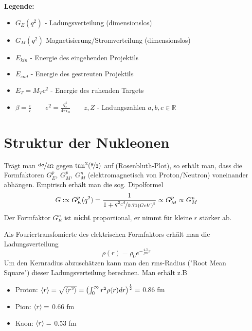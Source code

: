 \documentclass[Ex4_Zusammenfassung.tex]{subfiles}
\begin{document}
\textbf{Legende:} 
\begin{itemize} 
\item $G_E(q^2)$ - Ladungsverteilung (dimensionslos)
\item $G_M(q^2)$ Magnetisierung/Stromverteilung (dimensionslos)
\item $E_{kin}$ - Energie des eingehenden Projektils 
\item $E_ {end}$ - Energie des gestreuten Projektils
\item $E_T = M_T c^2$ - Energie des ruhenden Targets 
\item $\beta = \frac{v}{c} \qquad e^2=\frac{q_e^2}{4\pi \epsilon_0} \qquad z,Z$ - Ladungszahlen \qquad $a,b,c \in \mathbb{R}$
\end{itemize}
\section{Struktur der Nukleonen}
Trägt man $\nicefrac{\mathrm{d} \sigma}{\mathrm{d} \Omega}$ gegen $\tan^2(\nicefrac{\theta}{2})$ auf (Rosenbluth-Plot), so erhält man, dass die Formfaktoren $G_{E}^{p},\ G_M^p,\ G_M^n$ (elektromagnetisch von Proton/Neutron) voneinander abhängen. Empirisch erhält man die sog. Dipolformel
\begin{equation}
	G :\propto G_E^p(q^2) = \frac{1}{1+ \nicefrac{q^2c^4}{0.71 (GeV)^2}} \propto G_M^p \propto G_M^n
\end{equation}
Der Formfaktor $G_E^n$ ist \textbf{nicht} proportional, er nimmt für kleine $r$ stärker ab.
\begin{figure}[H]
\centering
{}
\end{figure}
Als Fouriertransfomierte des elektrischen Formfaktors erhält man die Ladungsverteilung
\begin{equation}
\rho(r) = \rho_0  e^{-\frac{4.3}{fm} r}
\end{equation}
Um den Kernradius abzuschätzen kann man den rms-Radius ("Root Mean Square") dieser Ladungsverteilung berechnen. Man erhält z.B 
\begin{itemize}
\item Proton: $\braket{r} = \sqrt{\braket{r^2}} = \left( \int_0^{\infty} r^2 \rho(r) dr \right)^{\frac{1}{2}} =$ 0.86 fm
\item Pion: $\braket{r} =$ 0.66 fm 
\item Kaon: $\braket{r} =$ 0.53 fm 
\end{itemize}
\end{document}
